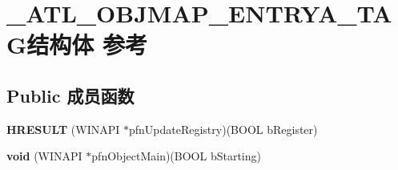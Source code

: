 \hypertarget{struct___a_t_l___o_b_j_m_a_p___e_n_t_r_y_a___t_a_g}{}\section{\+\_\+\+A\+T\+L\+\_\+\+O\+B\+J\+M\+A\+P\+\_\+\+E\+N\+T\+R\+Y\+A\+\_\+\+T\+A\+G结构体 参考}
\label{struct___a_t_l___o_b_j_m_a_p___e_n_t_r_y_a___t_a_g}
\subsection*{Public 成员函数}
\begin{DoxyCompactItemize}
\item 
\mbox{\label{struct___a_t_l___o_b_j_m_a_p___e_n_t_r_y_a___t_a_g_a0dca6bb8a2984a2d1bd0bc27cdb4b07a}} 
{\bfseries H\+R\+E\+S\+U\+LT} (W\+I\+N\+A\+PI $\ast$pfn\+Update\+Registry)(B\+O\+OL b\+Register)
\item 
\mbox{\label{struct___a_t_l___o_b_j_m_a_p___e_n_t_r_y_a___t_a_g_ab0549423c16bfa48314d1077f8be7d1c}} 
{\bfseries void} (W\+I\+N\+A\+PI $\ast$pfn\+Object\+Main)(B\+O\+OL b\+Starting)
\end{DoxyCompactItemize}

